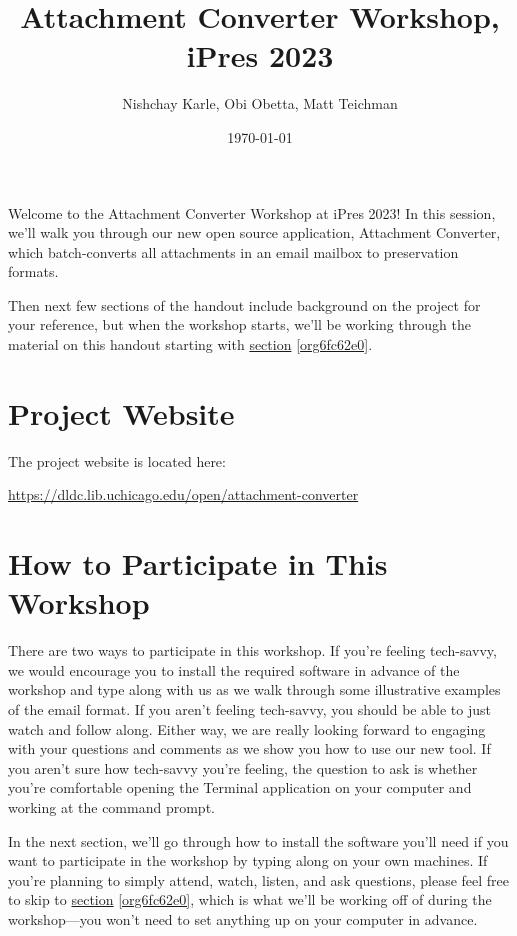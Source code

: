 \documentclass[11pt]{article}
\author{Nishchay Karle, Obi Obetta, Matt Teichman}
\date{\today}
\title{Attachment Converter Workshop, iPres 2023}
\begin{document}
\maketitle
Welcome to the Attachment Converter Workshop at iPres 2023!  In this
session, we'll walk you through our new open source application,
Attachment Converter, which batch-converts all attachments in an email
mailbox to preservation formats.

Then next few sections of the handout include background on the
project for your reference, but when the workshop starts, we'll be
working through the material on this handout starting with \hyperref[org6fc62e0]{section}
\ref{org6fc62e0}.

\section{Project Website}
\label{sec:org4ff2a3f}

The project website is located here:

\url{https://dldc.lib.uchicago.edu/open/attachment-converter}


\section{How to Participate in This Workshop}
\label{sec:org60687d6}

There are two ways to participate in this workshop.  If you're feeling
tech-savvy, we would encourage you to install the required software in
advance of the workshop and type along with us as we walk through some
illustrative examples of the email format.  If you aren't feeling
tech-savvy, you should be able to just watch and follow along.  Either
way, we are really looking forward to engaging with your questions and
comments as we show you how to use our new tool. If you aren't sure
how tech-savvy you're feeling, the question to ask is whether you're
comfortable opening the Terminal application on your computer and
working at the command prompt.

In the next section, we'll go through how to install the software
you'll need if you want to participate in the workshop by typing along
on your own machines.  If you're planning to simply attend, watch,
listen, and ask questions, please feel free to skip to
\hyperref[org6fc62e0]{section} \ref{org6fc62e0}, which is what we'll be working off
of during the workshop---you won't need to set anything up on your
computer in advance.
\end{document}
